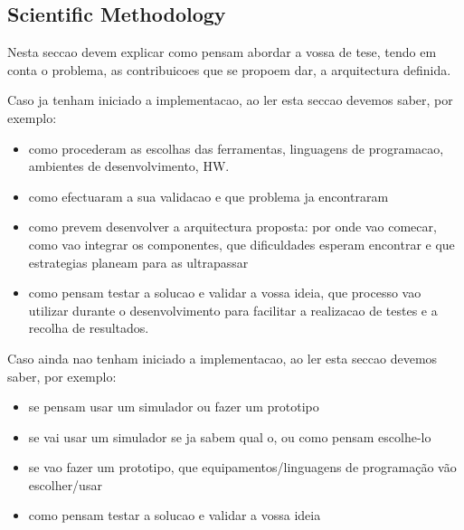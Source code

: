 
\subsection{Scientific Methodology} %
Nesta seccao devem explicar como pensam abordar a vossa de tese, tendo em conta o problema, as contribuicoes que se propoem dar, a arquitectura definida. 

Caso ja tenham iniciado a implementacao, ao ler esta seccao devemos saber, por exemplo:
\begin{itemize}
\item como procederam as escolhas das ferramentas, linguagens de programacao, ambientes de desenvolvimento, HW.
\item como efectuaram a  sua validacao e que problema ja encontraram
\item como prevem desenvolver a arquitectura proposta: por onde vao comecar, como vao integrar os componentes, que dificuldades esperam encontrar e que estrategias planeam para as ultrapassar
\item como pensam testar a solucao e validar a vossa ideia, que processo vao utilizar durante o desenvolvimento para facilitar a realizacao de testes e a recolha de resultados.
\end{itemize}


Caso ainda nao tenham iniciado a implementacao, ao ler esta seccao devemos saber, por exemplo:
\begin{itemize}
\item se pensam usar um simulador ou fazer um prototipo
\item se vai usar um simulador se ja sabem qual o, ou como pensam escolhe-lo
\item se vao fazer um prototipo, que equipamentos/linguagens de programação vão escolher/usar 
\item como pensam testar a solucao e validar a vossa ideia
\end{itemize}
